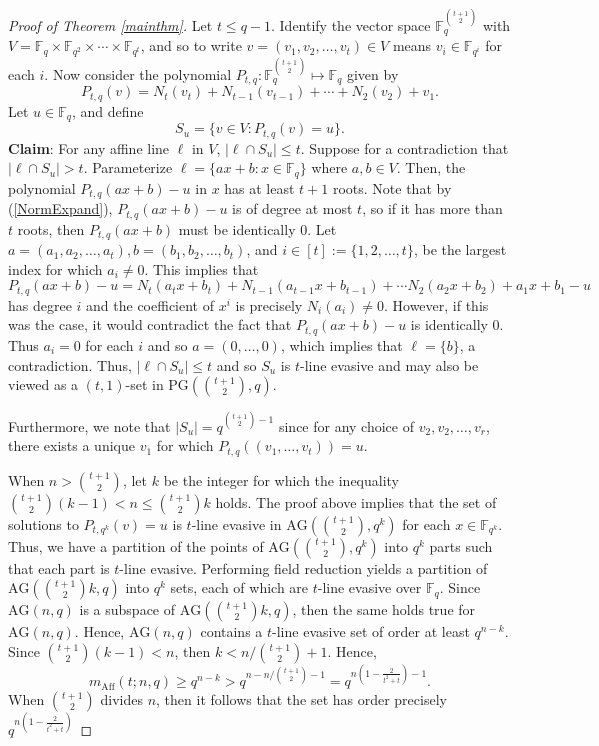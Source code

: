 \documentclass[12pt]{article}
\newcommand{\F}{\mathbb{F}}
\newcommand{\PG}{\text{PG}}
\newcommand{\AG}{\text{AG}}
\newcommand{\mpa}[3]{m_{\text{Aff}}(#1 ; #2, #3)}
\begin{document}
\begin{proof}[Proof of Theorem \ref{mainthm}]
Let $t \leq q-1$. Identify the vector space $\F_q^{\binom{t+1}{2}}$ with $V = \F_q \times \F_{q^2}\times \cdots \times\F_{q^{t}}$, and so to write $v = (v_1, v_2, \dots, v_{t}) \in V$ means $v_i \in \F_{q^i}$ for each $i$. Now consider the polynomial $P_{t, q}: \F_q^{\binom{t+1}{2}} \mapsto \F_q$ given by
$$
P_{t, q}(v) = N_{t}(v_{t}) + N_{t-1}(v_{t-1}) + \cdots + N_2(v_2) + v_1.
$$
Let $u \in \F_q$, and define 
$$
S_u = \{ v \in V: P_{t, q}(v) = u\}.
$$
\noindent \textbf{Claim}: For any affine line $\ell$ in $V$, $|\ell \cap S_u | \leq t$. 
Suppose for a contradiction that $|\ell \cap S_u| > t$. Parameterize $\ell = \{ ax + b: x\in \F_q \}$ where $a, b \in V$. Then, the polynomial $P_{t, q}(ax + b) - u$
in $x$ has at least $t+1$ roots. Note that by (\ref{NormExpand}), $P_{t, q}(ax + b) - u$ is of degree at most $t$, so if it has more than $t$ roots, then $P_{t, q}(ax + b)$ must be identically 0. Let $a = (a_1, a_2, \dots, a_{t}), b = (b_1, b_2, \dots, b_t)$, and $i \in [t] := \{ 1, 2, \dots, t \}$, be the largest index for which $a_i \neq 0$. This implies that
$$
P_{t, q}(ax + b) - u = N_t(a_tx + b_t) + N_{t-1}(a_{t-1}x + b_{t-1}) + \cdots N_2(a_2x + b_2) + a_1x + b_1-u
$$
has degree $i$ and the coefficient of $x^i$ is precisely $N_i(a_i) \neq 0$. However, if this was the case, it would contradict the fact that $P_{t, q}(ax + b) - u$ is identically 0. Thus $a_i =0$ for each $i$ and so $a = (0, \dots, 0)$, which implies that $\ell = \{ b\}$, a contradiction. Thus, $|\ell \cap S_u| \leq t$ and so $S_u$ is $t$-line evasive and may also be viewed as a $(t,1)$-set in $\PG(\binom{t + 1}{2}, q)$.

Furthermore, we note that $|S_u| = q^{\binom{t+1}{2}- 1}$ since for any choice of $v_2, v_2, \dots, v_{r}$, there exists a unique $v_1$ for which $P_{t, q}((v_1, \dots, v_{t})) = u$.


When $n > \binom{t+1}{2}$, let $k$ be the integer for which the inequality $\binom{t+1}{2}(k-1) <n \leq \binom{t+1}{2}k$ holds. The proof above implies that the set of solutions to $P_{t, q^k}(v) = u$ is $t$-line evasive in $\AG(\binom{t+1}{2}, q^k)$ for each $x \in \F_{q^k}$. Thus, we have a partition of the points of $\AG(\binom{t+1}{2}, q^k)$ into $q^k$ parts such that each part is $t$-line evasive. Performing field reduction yields a partition of $\AG(\binom{t+1}{2}k, q)$ into $q^k$ sets, each of which are $t$-line evasive over $\F_q$. Since $\AG(n, q)$ is a subspace of $\AG(\binom{t+1}{2}k, q)$, then the same holds true for $\AG(n, q)$. Hence, $\AG(n, q)$ contains a $t$-line evasive set of order at least $q^{n-k}$. Since $\binom{t+1}{2}(k-1) < n $, then $k < n/ \binom{t+1}{2} + 1$. Hence, 
$$
\mpa{t}{n}{q} \geq q^{n - k} > q^{n - n/\binom{t+1}{2} - 1} = q^{n\left( 1 - \frac{2}{t^2 + t} \right) - 1}.
$$
When $\binom{t+1}{2}$ divides $n$, then it follows that the set has order precisely $q^{n\left( 1 - \frac{2}{t^2 + t} \right)}$
\end{proof}
\end{document}
